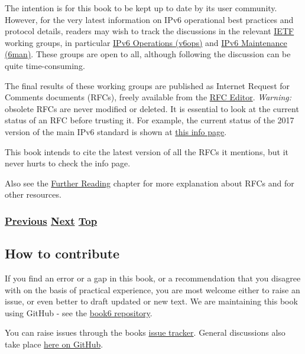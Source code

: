 \documentclass[
]{article}
\begin{document}
The intention is for this book to be kept up to date by its user
community. However, for the very latest information on IPv6 operational
best practices and protocol details, readers may wish to track the
discussions in the relevant \href{https://www.ietf.org}{IETF} working
groups, in particular
\href{https://datatracker.ietf.org/wg/v6ops/about/}{IPv6 Operations
(v6ops)} and \href{https://datatracker.ietf.org/wg/6man/about/}{IPv6
Maintenance (6man)}. These groups are open to all, although following
the discussion can be quite time-consuming.

The final results of these working groups are published as Internet
Request for Comments documents (RFCs), freely available from the
\href{https://www.rfc-editor.org/}{RFC Editor}. \emph{Warning:} obsolete
RFCs are never modified or deleted. It is essential to look at the
current status of an RFC before trusting it. For example, the current
status of the 2017 version of the main IPv6 standard is shown at
\href{https://www.rfc-editor.org/info/rfc8200}{this info page}.

This book intends to cite the latest version of all the RFCs it
mentions, but it never hurts to check the info page.

Also see the \hyperref[further-reading]{Further Reading} chapter for
more explanation about RFCs and for other resources.

\subsubsection{\texorpdfstring{\hyperref[how-a-network-operations-center-sees-ipv6]{Previous}
\hyperref[how-to-contribute]{Next}
\hyperref[introduction-and-foreword]{Top}}{Previous Next Top}}\label{previous-next-top-4}

\pagebreak

\subsection{How to contribute}\label{how-to-contribute}

If you find an error or a gap in this book, or a recommendation that you
disagree with on the basis of practical experience, you are most welcome
either to raise an issue, or even better to draft updated or new text.
We are maintaining this book using GitHub - see the
\href{https://github.com/becarpenter/book6}{book6 repository}.

You can raise issues through the book\textquotesingle s
\href{https://github.com/becarpenter/book6/issues}{issue tracker}.
General discussions also take place
\href{https://github.com/becarpenter/book6/discussions}{here on GitHub}.
\end{document}
